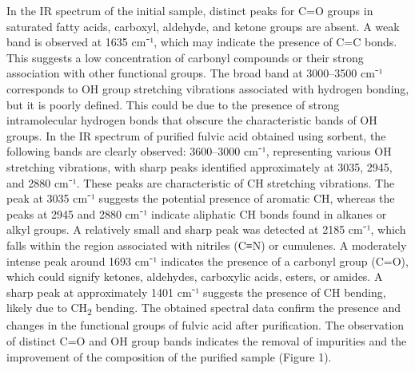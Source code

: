 In the IR spectrum of the initial sample, distinct peaks for C=O groups
in saturated fatty acids, carboxyl, aldehyde, and ketone groups are
absent. A weak band is observed at 1635 cm⁻¹, which may indicate the
presence of C=C bonds. This suggests a low concentration of carbonyl
compounds or their strong association with other functional groups. The
broad band at 3000--3500 cm⁻¹ corresponds to OH group stretching
vibrations associated with hydrogen bonding, but it is poorly defined.
This could be due to the presence of strong intramolecular hydrogen
bonds that obscure the characteristic bands of OH groups. In the IR
spectrum of purified fulvic acid obtained using sorbent, the following
bands are clearly observed: 3600--3000 cm⁻¹, representing various OH
stretching vibrations, with sharp peaks identified approximately at
3035, 2945, and 2880 cm⁻¹. These peaks are characteristic of CH
stretching vibrations. The peak at 3035 cm⁻¹ suggests the potential
presence of aromatic CH, whereas the peaks at 2945 and 2880 cm⁻¹
indicate aliphatic CH bonds found in alkanes or alkyl groups. A
relatively small and sharp peak was detected at 2185 cm⁻¹, which falls
within the region associated with nitriles (C≡N) or cumulenes. A
moderately intense peak around 1693 cm⁻¹ indicates the presence of a
carbonyl group (C=O), which could signify ketones, aldehydes, carboxylic
acids, esters, or amides. A sharp peak at approximately 1401 cm⁻¹
suggests the presence of CH bending, likely due to CH\textsubscript{2}
bending. The obtained spectral data confirm the presence and changes in
the functional groups of fulvic acid after purification. The observation
of distinct C=O and OH group bands indicates the removal of impurities
and the improvement of the composition of the purified sample (Figure
1).

% 
% 


